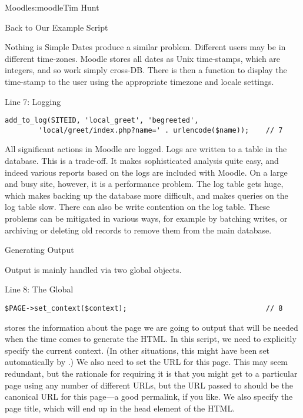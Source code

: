 \begin{aosachapter}{Moodle}{s:moodle}{Tim Hunt}
\begin{aosasect1}{Back to Our Example Script}
\begin{aosasect2}{Nothing is Simple}
Dates produce a similar problem. Different users may be in different
time-zones. Moodle stores all dates as Unix time-stamps, which are
integers, and so work simply cross-DB. There is then a 
function to display the time-stamp to the user using the appropriate
timezone and locale settings.

\end{aosasect2}

\begin{aosasect2}{Line 7: Logging}

\begin{verbatim}
add_to_log(SITEID, 'local_greet', 'begreeted',
        'local/greet/index.php?name=' . urlencode($name));    // 7
\end{verbatim}

All significant actions in Moodle are logged. Logs are written to a
table in the database. This is a trade-off. It makes sophisticated
analysis quite easy, and indeed various reports based on the logs are
included with Moodle. On a large and busy site, however, it is a
performance problem. The log table gets huge, which makes backing up
the database more difficult, and makes queries on the log table
slow. There can also be write contention on the log table. These
problems can be mitigated in various ways, for example by batching
writes, or archiving or deleting old records to remove them from the
main database.

\end{aosasect2}

\end{aosasect1}

\begin{aosasect1}{Generating Output}

Output is mainly handled via two global objects.

\begin{aosasect2}{Line 8: The  Global}

\begin{verbatim}
$PAGE->set_context($context);                                 // 8
\end{verbatim}

 stores the information about the page we are going to
output that will be needed when the time comes to generate the
HTML. In this script, we need to explicitly specify the current
context. (In other situations, this might have been set automatically
by .) We also need to set the URL for this
page. This may seem redundant, but the rationale for requiring it is that
you might get to a particular page using any number of different URLs,
but the URL passed to  should be the canonical URL for
this page---a good permalink, if you like. We also specify the page
title, which will end up in the head element of the HTML.


\end{aosasect2}
\end{aosasect1}
\end{aosachapter}
